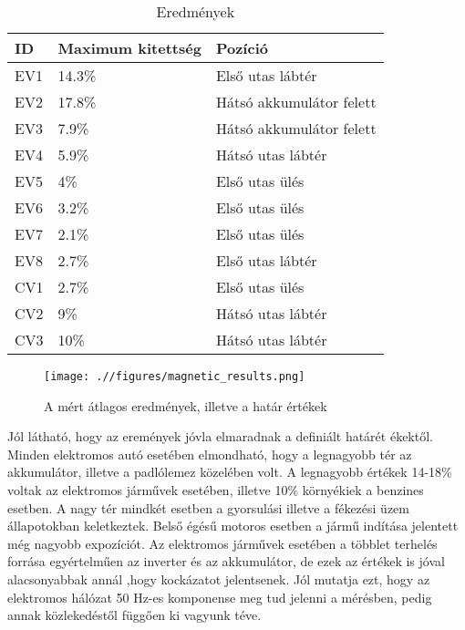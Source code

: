 \begin{table}[h]
\centering
\caption{Eredmények}
\label{tab:results}
\begin{tabular}{lll}
\hline
\multicolumn{1}{|l}{ID} & Maximum kitettség   & Pozíció \\ \hline
EV1                     & 14.3\%         	  & Első utas lábtér           \\
EV2                     & 17.8\%              & Hátsó akkumulátor felett   \\
EV3                     & 7.9\%               & Hátsó akkumulátor felett   \\
EV4                     & 5.9\%               & Hátsó utas lábtér          \\
EV5                     & 4\%                 & Első utas ülés             \\
EV6                     & 3.2\%               & Első utas ülés             \\
EV7                     & 2.1\%               & Első utas ülés             \\
EV8                     & 2.7\%               & Első utas lábtér           \\
CV1                     & 2.7\%               & Első utas ülés             \\
CV2                     & 9\%                 & Hátsó utas lábtér          \\
CV3                     & 10\%                & Hátsó utas lábtér          \\ \hline
\end{tabular}
\end{table}

\begin{figure}[h]
 \centerline{\texttt{[image: .//figures/magnetic\_results.png]}}
 \caption{A mért átlagos eredmények, illetve a határ értékek}
 \label{fig:mag_results}
\end{figure}

Jól látható, hogy az eremények jóvla elmaradnak a definiált határét ékektől. Minden elektromos autó esetében elmondható, hogy a legnagyobb tér az akkumulátor, illetve a padlólemez közelében volt. A legnagyobb értékek 14-18\% voltak az elektromos járművek esetében, illetve 10\% környékiek a benzines esetben. A nagy tér mindkét esetben a gyorsulási illetve a fékezési üzem állapotokban keletkeztek. Belső égésű motoros esetben a jármű indítása jelentett még nagyobb expozíciót. Az elektromos járművek esetében a többlet terhelés forrása egyértelműen az inverter és az akkumulátor, de ezek az értékek is jóval alacsonyabbak annál ,hogy kockázatot jelentsenek. Jól mutatja ezt, hogy az elektromos hálózat 50 Hz-es komponense meg tud jelenni a mérésben, pedig annak közlekedéstől függően ki vagyunk téve.

